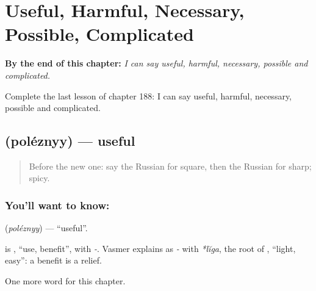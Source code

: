 
\chapter{Useful, Harmful, Necessary, Possible, Complicated}
\label{ch:ru-useful-harmful-necessary-possible-complicated}

\begin{chapteropening}
\textbf{By the end of this chapter:} \emph{I can say useful, harmful, necessary, possible and complicated.}

Complete the last lesson of chapter 188: I can say useful, harmful, necessary, possible and complicated.
\end{chapteropening}

\section[\texorpdfstring{\ru{полезный} (poléznyy)}{полезный (poléznyy)}]{ (poléznyy) — useful}

\label{lesson:RU-C188-poleznyy}



\begin{quote}
Before the new one: say the Russian for square, then the Russian for sharp; spicy.
\end{quote}

\subsection*{You'll want to know: }
\textbf{} (\emph{poléznyy}) — \textquotedblleft{}useful\textquotedblright{}.

\begin{cousinweb}
\textbf{} is \emph{}, \textquotedblleft{}use, benefit\textquotedblright{}, with \emph{-}. Vasmer explains \emph{} as \emph{-} with \emph{*lĭga}, the root of \emph{}, \textquotedblleft{}light, easy\textquotedblright{}: a benefit is a relief.
\end{cousinweb}

\begin{grammarlens}[title={What you've built}]
One more word for this chapter.
\end{grammarlens}

